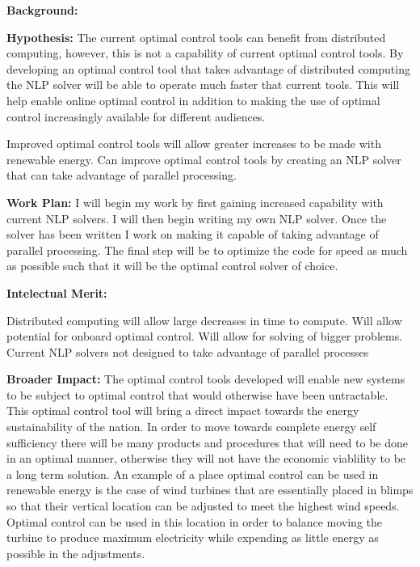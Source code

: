 \documentclass[12pt]{article}
\begin{document}

\textbf{Background:}

\bigskip


\textbf{Hypothesis:} The current optimal control tools can benefit from
distributed computing, however, this is not a capability of current optimal
control tools. By developing an optimal control tool that takes advantage of
distributed computing the NLP solver will be able to operate much faster that
current tools. This will help enable online optimal control in addition to
making the use of optimal control increasingly available for different
audiences.

Improved optimal control tools will allow greater
increases to be made with renewable energy. Can improve optimal control tools
by creating an NLP solver that can take advantage of parallel processing.

\bigskip


\textbf{Work Plan:} I will begin my work by first gaining increased capability
with current NLP solvers. I will then begin writing my own NLP solver. Once the
solver has been written I work on making it capable of taking advantage of
parallel processing.  The final step will be to optimize the code for speed as
much as possible such that it will be the optimal control solver of choice.

\bigskip


\textbf{Intelectual Merit:} 

Distributed computing will allow large decreases in
time to compute. Will allow potential for onboard optimal control. Will allow
for solving of bigger problems. Current NLP solvers not designed to take
advantage of parallel processes

\bigskip


\textbf{Broader Impact:} The optimal control tools developed will enable new
systems to be subject to optimal control that would otherwise have been
untractable. This optimal control tool will bring a direct impact towards the
energy sustainability of the nation. In order to move towards complete energy
self sufficiency there will be many products and procedures that will need to
be done in an optimal manner, otherwise they will not have the economic
viablility to be a long term solution. An example of a place optimal control
can be used in renewable energy is the case of wind turbines that are
essentially placed in blimps so that their vertical location can be adjusted to
meet the highest wind speeds. Optimal control can be used in this location in
order to balance moving the turbine to produce maximum electricity while
expending as little energy as possible in the adjustments.
\end{document}
